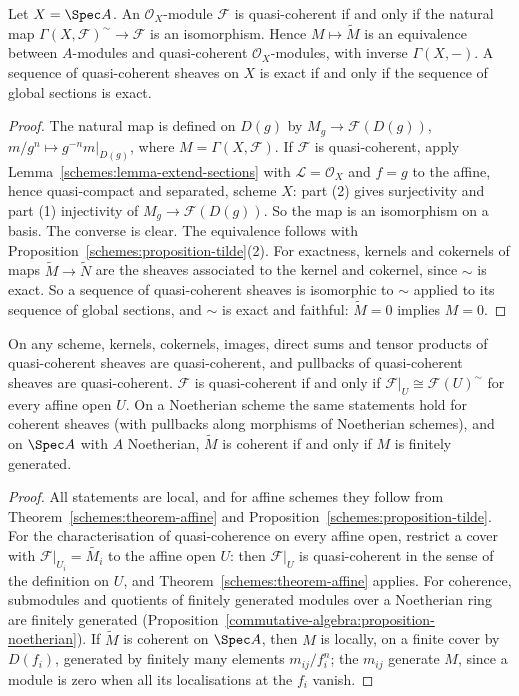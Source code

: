 \begin{theorem}\label{schemes:theorem-affine}
Let $X = \Spec A$. An $\mathcal{O}_X$-module $\mathcal{F}$ is quasi-coherent if and only if the natural map $\Gamma(X, \mathcal{F})^\sim \to \mathcal{F}$ is an
isomorphism. Hence $M \mapsto \widetilde M$ is an equivalence between $A$-modules and quasi-coherent $\mathcal{O}_X$-modules, with inverse $\Gamma(X, -)$. A
sequence of quasi-coherent sheaves on $X$ is exact if and only if the sequence of global sections is exact.
\end{theorem}

\begin{proof}
The natural map is defined on $D(g)$ by $M_g \to \mathcal{F}(D(g))$, $m/g^n \mapsto g^{-n}m|_{D(g)}$, where $M = \Gamma(X, \mathcal{F})$. If $\mathcal{F}$ is
quasi-coherent, apply Lemma~\ref{schemes:lemma-extend-sections} with $\mathcal{L} = \mathcal{O}_X$ and $f = g$ to the affine, hence quasi-compact
and separated, scheme $X$: part (2) gives surjectivity and part (1) injectivity of $M_g \to \mathcal{F}(D(g))$. So the map is an isomorphism on a basis.
The converse is clear. The equivalence follows with Proposition~\ref{schemes:proposition-tilde}(2). For exactness, kernels and cokernels
of maps $\widetilde M \to \widetilde N$ are the sheaves associated to the kernel and cokernel, since $\sim$ is exact. So a sequence of quasi-coherent sheaves
is isomorphic to $\sim$ applied to its sequence of global sections, and $\sim$ is exact and faithful: $\widetilde M = 0$ implies $M = 0$.
\end{proof}

\begin{corollary}\label{schemes:corollary-qc-properties}
On any scheme, kernels, cokernels, images, direct sums and tensor products of quasi-coherent sheaves are quasi-coherent, and pullbacks of
quasi-coherent sheaves are quasi-coherent. $\mathcal{F}$ is quasi-coherent if and only if $\mathcal{F}|_U \cong \mathcal{F}(U)^\sim$ for every affine open $U$.
On a Noetherian scheme the same statements hold for coherent sheaves (with pullbacks along morphisms of Noetherian schemes), and on
$\Spec A$ with $A$ Noetherian, $\widetilde M$ is coherent if and only if $M$ is finitely generated.
\end{corollary}

\begin{proof}
All statements are local, and for affine schemes they follow from Theorem~\ref{schemes:theorem-affine} and
Proposition~\ref{schemes:proposition-tilde}. For the characterisation of quasi-coherence on every affine open, restrict a cover with
$\mathcal{F}|_{U_i} = \widetilde{M_i}$ to the affine open $U$: then $\mathcal{F}|_U$ is quasi-coherent in the sense of the definition on $U$, and
Theorem~\ref{schemes:theorem-affine} applies. For coherence, submodules and quotients of finitely generated modules over a Noetherian ring are
finitely generated (Proposition~\ref{commutative-algebra:proposition-noetherian}). If $\widetilde M$ is coherent on $\Spec A$, then $M$ is locally, on a
finite cover by $D(f_i)$, generated by finitely many elements $m_{ij}/f_i^{n}$; the $m_{ij}$ generate $M$, since a module is zero when all its
localisations at the $f_i$ vanish.
\end{proof}

